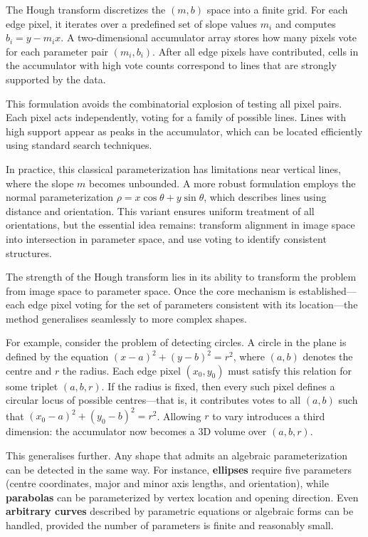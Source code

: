 The Hough transform discretizes the $(m, b)$ space into a finite grid. For each edge pixel, it iterates over a predefined set of slope values $m_i$ and computes $b_i = y - m_i x$. A two-dimensional accumulator array stores how many pixels vote for each parameter pair $(m_i, b_i)$. After all edge pixels have contributed, cells in the accumulator with high vote counts correspond to lines that are strongly supported by the data.

This formulation avoids the combinatorial explosion of testing all pixel pairs. Each pixel acts independently, voting for a family of possible lines. Lines with high support appear as peaks in the accumulator, which can be located efficiently using standard search techniques.

In practice, this classical parameterization has limitations near vertical lines, where the slope $m$ becomes unbounded. A more robust formulation employs the normal parameterization $\rho = x\cos\theta + y\sin\theta$, which describes lines using distance and orientation. This variant ensures uniform treatment of all orientations, but the essential idea remains: transform alignment in image space into intersection in parameter space, and use voting to identify consistent structures.

The strength of the Hough transform lies in its ability to transform the problem from image space to parameter space. Once the core mechanism is established—each edge pixel voting for the set of parameters consistent with its location—the method generalises seamlessly to more complex shapes.

For example, consider the problem of detecting circles. A circle in the plane is defined by the equation $(x - a)^2 + (y - b)^2 = r^2$, where $(a, b)$ denotes the centre and $r$ the radius. Each edge pixel $(x_0, y_0)$ must satisfy this relation for some triplet $(a, b, r)$. If the radius is fixed, then every such pixel defines a circular locus of possible centres—that is, it contributes votes to all $(a, b)$ such that $(x_0 - a)^2 + (y_0 - b)^2 = r^2$. Allowing $r$ to vary introduces a third dimension: the accumulator now becomes a 3D volume over $(a, b, r)$.

This generalises further. Any shape that admits an algebraic parameterization can be detected in the same way. For instance, \textbf{ellipses} require five parameters (centre coordinates, major and minor axis lengths, and orientation), while \textbf{parabolas} can be parameterized by vertex location and opening direction. Even \textbf{arbitrary curves} described by parametric equations or algebraic forms can be handled, provided the number of parameters is finite and reasonably small.


